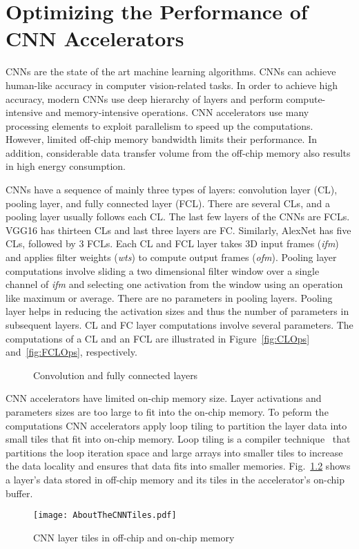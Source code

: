 \graphicspath{{./Ch3-CNN/images/}}

\chapter{Optimizing the Performance of CNN Accelerators} \label{chap:CNN}
CNNs are the state of the art machine learning algorithms. CNNs can achieve human-like accuracy in computer vision-related tasks. In order to achieve high accuracy, modern CNNs use deep hierarchy of layers and perform compute-intensive and memory-intensive operations. CNN accelerators use many processing elements to exploit parallelism to speed up the computations. However, limited off-chip memory bandwidth limits their performance. In addition, considerable data transfer volume from the off-chip memory also results in high energy consumption.

CNNs have a sequence of mainly three types of layers: convolution layer (CL), pooling layer, and fully connected layer (FCL). There are several CLs, and a pooling layer usually follows each CL. The last few layers of the CNNs are FCLs. VGG16 has thirteen CLs and last three layers are FC. Similarly, AlexNet has five CLs, followed by 3 FCLs. Each CL and FCL layer takes 3D input frames (\textit{ifm}) and applies filter weights (\textit{wts}) to compute output frames (\textit{ofm}). Pooling layer computations involve sliding a two dimensional filter window over a single channel of \textit{ifm} and selecting one activation from the window using an operation like maximum or average. There are no parameters in pooling layers. Pooling layer helps in reducing the activation sizes and thus the number of parameters in subsequent layers. CL and FC layer computations involve several parameters. The computations of a CL and an FCL are illustrated in Figure~\ref{fig:CLOps} and~\ref{fig:FCLOps}, respectively. 
\begin{figure}[!htb]
	\centering
	\captionsetup{font=sf}	
	\hfil	
	\hfil	
	\caption{Convolution and fully connected layers}
	\label{fig:CNNAcceleratorAndCLOps}
\end{figure}

CNN accelerators have limited on-chip memory size. Layer activations and parameters sizes are too large to fit into the on-chip memory. To peform the computations CNN accelerators apply loop tiling to partition the layer data into small tiles that fit into on-chip memory. Loop tiling is a compiler  technique~\cite{aho2006compilers} that partitions the loop iteration space and large arrays into smaller tiles to increase the data locality and ensures that data fits into smaller memories. Fig.~\ref{fig:partitioningDataUsingTiling} shows a layer's data stored in off-chip memory and its tiles in the accelerator's on-chip buffer.
\begin{figure}[!htb]
	\centering
	\captionsetup{font=sf}	
	\texttt{[image: AboutTheCNNTiles.pdf]}
	\caption{CNN layer tiles in off-chip and on-chip memory}
	\label{fig:partitioningDataUsingTiling}
\end{figure}

